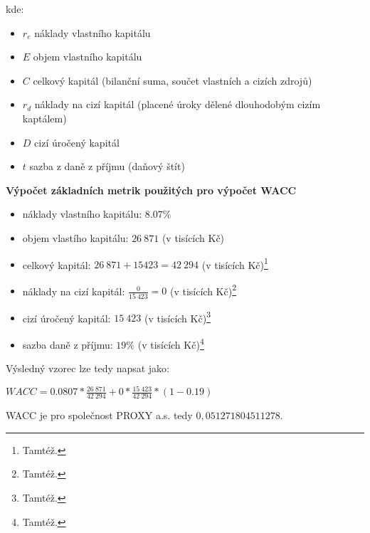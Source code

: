 kde:\\

\begin{itemize}
	\item $r_e$ náklady vlastního kapitálu
	\item $E$ objem vlastního kapitálu
	\item $C$ celkový kapitál (bilanční suma, součet vlastních a cizích zdrojů)
	\item $r_d$ náklady na cizí kapitál (placené úroky dělené dlouhodobým cizím kaptálem)
	\item $D$ cizí úročený kapitál
	\item $t$ sazba z daně z příjmu (daňový štít)
\end{itemize}

\noindent\textbf{Výpočet základních metrik použitých pro výpočet WACC}

\begin{itemize}
	\item náklady vlastního kapitálu: $8.07\%$%
	\item objem vlastího kapitálu: $26\ 871$ (v tisících Kč)
	\item celkový kapitál: $26\ 871 + 15 423 = 42\ 294$ (v tisících Kč)\footnote{Tamtéž.}
	\item náklady na cizí kapitál: $\frac{0}{15\ 423} = 0$ (v tisících Kč)\footnote{Tamtéž.}
	\item cizí úročený kapitál: $15\ 423$ (v tisících Kč)\footnote{Tamtéž.}
	\item sazba daně z příjmu: $19\%$ (v tisících Kč)\footnote{Tamtéž.}
\end{itemize}

Výsledný vzorec lze tedy napsat jako:

\begin{center}
$WACC = 0.0807 * \frac{26\ 871}{42\ 294} + 0 * \frac{15\ 423}{42\ 294} * (1 - 0.19)$	
\end{center}

WACC je pro společnost PROXY a.s. tedy $0,051271804511278$.


